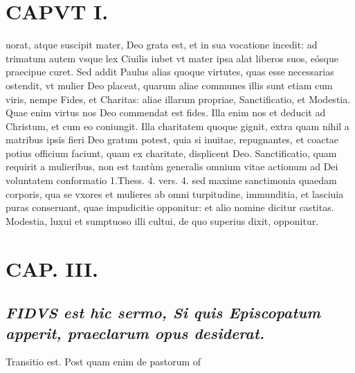 \documentclass{article}
\begin{document}
\begin{pages}
\section*{CAPVT I. }
\marginpar{[ p.91 ]}\pstart uorat, atque suscipit mater, Deo grata est, et in sua vocatione incedit: ad trimatum autem vsque lex Ciuilis iubet vt mater ipsa alat liberos suos, eósque praecipue curet.  \pend\pstart Sed addit Paulus alias quoque virtutes, quas esse necessarias ostendit, vt mulier Deo placeat, quarum aliae communes illis sunt etiam cum viris, nempe Fides, et Charitas: aliae illarum propriae, Sanctificatio, et Modestia. Quae enim virtus nos Deo commendat est fides. Illa enim nos et deducit ad Christum, et cum eo coniungit. Illa charitatem quoque gignit, extra quam nihil a matribus ipsis fieri Deo gratum potest, quia si inuitae, repugnantes, et coactae potius officium faciunt, quam ex charitate, displicent Deo.  \pend\pstart Sanctificatio, quam requirit a mulieribus, non est tantùm generalis omnium vitae actionum ad Dei voluntatem conformatio 1.Thess. 4. vers. 4. sed maxime sanctimonia quaedam corporis, qua se vxores et mulieres ab omni turpitudine, immunditia, et lasciuia puras conseruant, quae impudicitie opponitur: et alio nomine dicitur castitas. Modestia, luxui et sumptuoso illi cultui, de quo superius dixit, opponitur.  \pend
\endnumbering\beginnumbering\section{CAP. III.}
{}
\subsection*{\textit{\huge\textbf{F}\normalsize IDVS est hic sermo, Si quis Episcopatum apperit, praeclarum opus desiderat. }}\pstart Transitio est. Post quam enim de pastorum of\pend

\end{pages}
\end{document}

